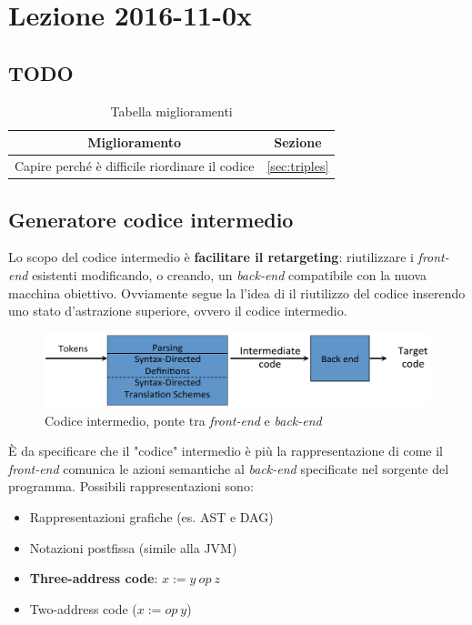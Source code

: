 \section{Lezione 2016-11-0x}
\subsection{TODO}
\begin{table}[H]
\begin{center}
\begin{tabular}{|p{\textwidth}|c|}
\hline
\multicolumn{1}{|c|}{\textbf{Miglioramento}} & \textbf{Sezione} \\ \hline
Capire perch\'e \`e difficile riordinare il codice &
\ref{sec:triples} \\ \hline
\end{tabular}
\end{center}
\caption{Tabella miglioramenti}
\label{tab:tab_todo}
\end{table}

\subsection{Generatore codice intermedio}
Lo scopo del codice intermedio \`e \textbf{facilitare il retargeting}:
riutilizzare i \textit{front-end} esistenti modificando, o creando, un
\textit{back-end} compatibile con la nuova macchina obiettivo. Ovviamente segue
la l'idea di il riutilizzo del codice inserendo uno stato d'astrazione
superiore, ovvero il codice intermedio.

\begin{figure}[H]
  \includegraphics[scale=0.4]{res/image/compiler_backend}
  \caption{Codice intermedio, ponte tra \textit{front-end} e \textit{back-end}}
  \label{img:compiler_backend}
\end{figure}

\`E da specificare che il "codice" intermedio \`e pi\`u la rappresentazione
di come il \textit{front-end} comunica le azioni semantiche al
\textit{back-end} specificate nel sorgente del programma. Possibili
rappresentazioni sono:
\begin{itemize}
\item Rappresentazioni grafiche (es. AST e DAG)
\item Notazioni postfissa (simile alla JVM)
\item \textbf{Three-address code}: $x := y \ op \ z$
\item Two-address code ($x := op \ y$)
\end{itemize}

